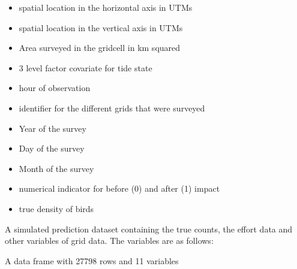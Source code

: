 \documentclass[a4paper]{book}
\begin{document}
\begin{Details}\relax
\begin{itemize}

\item {} spatial location in the horizontal axis in UTMs
\item {} spatial location in the vertical axis in UTMs
\item {} Area surveyed in the gridcell in km squared
\item {} 3 level factor covariate for tide state
\item {} hour of observation
\item {} identifier for the different grids that were surveyed
\item {} Year of the survey
\item {} Day of the survey
\item {} Month of the survey 
\item {} numerical indicator for before (0) and after (1) impact
\item {} true density of birds

\end{itemize}

\end{Details}
%
\begin{Description}\relax
A simulated prediction dataset containing the true counts, the effort data and other variables of 
grid data. The variables are as follows:
\end{Description}
%
\begin{Format}
A data frame with 27798 rows and 11 variables
\end{Format}
%
\end{document}
